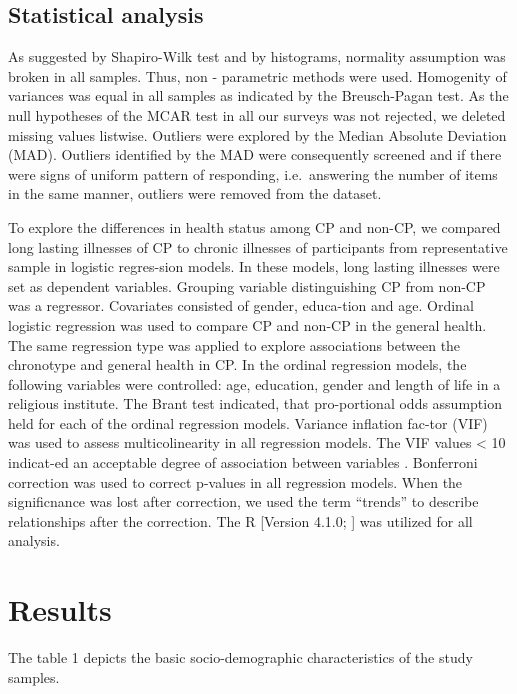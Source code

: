 \documentclass[ijerph,article,accept,moreauthors,pdftex]{mdpi}
\begin{document}
\hypertarget{statistical-analysis}{%
\subsection{Statistical analysis}\label{statistical-analysis}}

As suggested by Shapiro-Wilk test and by histograms, normality
assumption was broken in all samples. Thus, non - parametric methods
were used. Homogenity of variances was equal in all samples as indicated
by the Breusch-Pagan test. As the null hypotheses of the MCAR test in
all our surveys was not rejected, we deleted missing values listwise.
Outliers were explored by the Median Absolute Deviation (MAD). Outliers
identified by the MAD were consequently screened and if there were signs
of uniform pattern of responding, i.e.~answering the number of items in
the same manner, outliers were removed from the dataset.

To explore the differences in health status among CP and non-CP, we
compared long lasting illnesses of CP to chronic illnesses of
participants from representative sample in logistic regres-sion models.
In these models, long lasting illnesses were set as dependent variables.
Grouping variable distinguishing CP from non-CP was a regressor.
Covariates consisted of gender, educa-tion and age. Ordinal logistic
regression was used to compare CP and non-CP in the general health. The
same regression type was applied to explore associations between the
chronotype and general health in CP. In the ordinal regression models,
the following variables were controlled: age, education, gender and
length of life in a religious institute. The Brant test indicated, that
pro-portional odds assumption held for each of the ordinal regression
models. Variance inflation fac-tor (VIF) was used to assess
multicolinearity in all regression models. The VIF values \textless{} 10
indicat-ed an acceptable degree of association between variables
\citep{TAY2017}. Bonferroni correction was used to correct p-values in
all regression models. When the significnance was lost after correction,
we used the term ``trends'' to describe relationships after the
correction. The R {[}Version 4.1.0; \citet{R-base}{]} was utilized for
all analysis.

\hypertarget{results}{%
\section{Results}\label{results}}

The table 1 depicts the basic socio-demographic characteristics of the
study samples.
\end{document}
